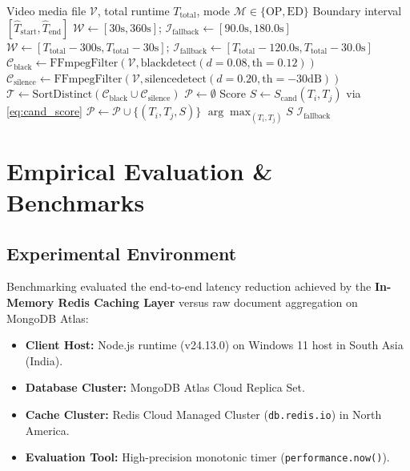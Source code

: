 \documentclass[conference]{IEEEtran}
\begin{document}
\begin{algorithm}[t]
\caption{Autonomous Audio-Visual OP/ED Boundary Detection}
\label{alg:boundary}
\begin{algorithmic}[1]
\REQUIRE Video media file $\mathcal{V}$, total runtime $T_{\text{total}}$, mode $\mathcal{M} \in \{\text{OP}, \text{ED}\}$
\ENSURE Boundary interval $[\hat{T}_{\text{start}}, \hat{T}_{\text{end}}]$
    \STATE $\mathcal{W} \gets [30\text{s}, 360\text{s}]$; $\mathcal{I}_{\text{fallback}} \gets [90.0\text{s}, 180.0\text{s}]$
\ELSE
    \STATE $\mathcal{W} \gets [T_{\text{total}} - 300\text{s}, T_{\text{total}} - 30\text{s}]$; $\mathcal{I}_{\text{fallback}} \gets [T_{\text{total}} - 120.0\text{s}, T_{\text{total}} - 30.0\text{s}]$
\ENDIF
\STATE $\mathcal{C}_{\text{black}} \gets \text{FFmpegFilter}(\mathcal{V}, \text{blackdetect}(d=0.08, \text{th}=0.12))$
\STATE $\mathcal{C}_{\text{silence}} \gets \text{FFmpegFilter}(\mathcal{V}, \text{silencedetect}(d=0.20, \text{th}=-30\text{dB}))$
\STATE $\mathcal{T} \gets \text{SortDistinct}(\mathcal{C}_{\text{black}} \cup \mathcal{C}_{\text{silence}})$
\STATE $\mathcal{P} \gets \emptyset$
        \STATE Score $S \gets S_{\text{cand}}(T_i, T_j)$ via \eqref{eq:cand_score}
        \STATE $\mathcal{P} \gets \mathcal{P} \cup \{(T_i, T_j, S)\}$
    \ENDIF
\ENDFOR
{}
    \RETURN $\arg\max_{(T_i, T_j)} S$ 
\ELSE
    \RETURN $\mathcal{I}_{\text{fallback}}$ 
\ENDIF
\end{algorithmic}
\end{algorithm}

\section{Empirical Evaluation \& Benchmarks}

\subsection{Experimental Environment}
Benchmarking evaluated the end-to-end latency reduction achieved by the \textbf{In-Memory Redis Caching Layer} versus raw document aggregation on MongoDB Atlas:
\begin{itemize}
    \item \textbf{Client Host:} Node.js runtime (v24.13.0) on Windows 11 host in South Asia (India).
    \item \textbf{Database Cluster:} MongoDB Atlas Cloud Replica Set.
    \item \textbf{Cache Cluster:} Redis Cloud Managed Cluster (\texttt{db.redis.io}) in North America.
    \item \textbf{Evaluation Tool:} High-precision monotonic timer (\texttt{performance.now()}).
\end{itemize}
\end{document}

